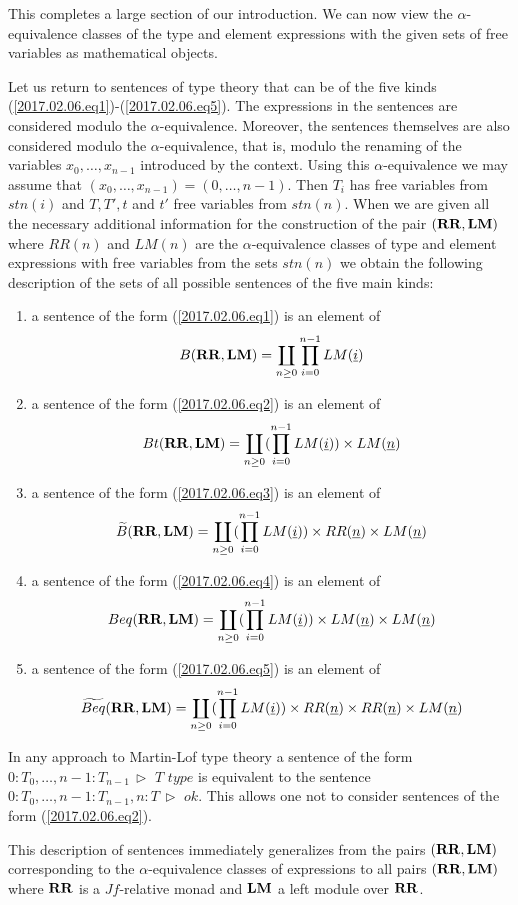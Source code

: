\documentclass[12pt]{amsart}
\newcommand{\uu}{\underline}
\newcommand{\wt}{\widetilde}
\newcommand{\RR}{{\bf RR}}
\newcommand{\LM}{{\bf LM}}
\newcommand{\rh}{{\,\rhd\,\,}}
\newcommand{\type}{\,\,type}
\newcommand{\ff}[1]{\uu{#1}}
\begin{document}
This completes a large section of our introduction. We can now view the $\alpha$-equivalence classes of the type and element expressions with the given sets of free variables as mathematical objects. 

Let us return to sentences of type theory that can be of the five kinds (\ref{2017.02.06.eq1})-(\ref{2017.02.06.eq5}). The expressions in the sentences are considered modulo the $\alpha$-equivalence. Moreover, the sentences themselves are also considered modulo the $\alpha$-equivalence, that is, modulo the renaming of the variables $x_0,\dots,x_{n-1}$ introduced by the context. Using this $\alpha$-equivalence we may assume that $(x_0,\dots,x_{n-1})=(0,\dots,n-1)$. Then $T_i$ has free variables from $stn(i)$ and $T,T',t$ and $t'$ free variables from $stn(n)$. When we are given all the necessary additional information for the construction of the pair $(\RR,\LM)$ where $RR(n)$ and $LM(n)$ are the $\alpha$-equivalence classes of type and element expressions with free variables from the sets $stn(n)$ we obtain the following description of the sets of all possible sentences of the five  main kinds:
%
\begin{enumerate}
\item a sentence of the form (\ref{2017.02.06.eq1}) is an element of
%
$$B(\RR,\LM)=\coprod_{n\ge 0} \prod_{i=0}^{n-1}LM(\ff{i})$$
%
\item a sentence of the form (\ref{2017.02.06.eq2}) is an element of
%
$$Bt(\RR,\LM)=\coprod_{n\ge 0} (\prod_{i=0}^{n-1}LM(\ff{i}))\times LM(\ff{n})$$
%
\item a sentence of the form (\ref{2017.02.06.eq3}) is an element of
%
$$\wt{B}(\RR,\LM)=\coprod_{n\ge 0} (\prod_{i=0}^{n-1}LM(\ff{i}))\times RR(\ff{n})\times LM(\ff{n})$$
%
\item a sentence of the form (\ref{2017.02.06.eq4}) is an element of
%
$$Beq(\RR,\LM)=\coprod_{n\ge 0} (\prod_{i=0}^{n-1}LM(\ff{i}))\times LM(\ff{n})\times LM(\ff{n})$$
%
\item a sentence of the form (\ref{2017.02.06.eq5}) is an element of
%
$$\wt{Beq}(\RR,\LM)=\coprod_{n\ge 0} (\prod_{i=0}^{n-1}LM(\ff{i}))\times RR(\ff{n})\times RR(\ff{n})\times LM(\ff{n})$$
%
\end{enumerate}
%
In any approach to Martin-Lof type theory a sentence of the form $0:T_0,\dots,n-1:T_{n-1}\rh T\type$ is equivalent to the sentence $0:T_0,\dots, n-1:T_{n-1},n:T\rh ok$. This allows one not to consider sentences of the form (\ref{2017.02.06.eq2}). 

This description of sentences immediately generalizes from the pairs $(\RR,\LM)$ corresponding to the $\alpha$-equivalence classes of expressions to all pairs $(\RR,\LM)$ where $\RR$ is a $Jf$-relative monad and $\LM$ a left module over $\RR$. 
\end{document}
